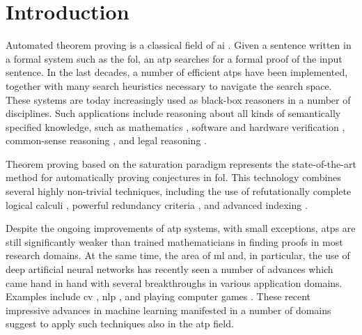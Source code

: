 \documentclass{article}
\begin{document}
\maketitle


\begin{abstract}

\end{abstract}

\section{Introduction}

Automated theorem proving is a classical field of \gls{ai} \cite{Russell2010}.
Given a sentence written in a formal system such as the \gls{fol},
an \gls{atp} searches for a formal proof of the input sentence.
In the last decades, a number of efficient \glspl{atp} have been implemented,
together with many search heuristics necessary to navigate the search space.
These systems are today increasingly used as black-box reasoners in a number of disciplines.
Such applications include reasoning about all kinds of semantically specified knowledge,
such as mathematics \cite{Kinyon2013},
software and hardware verification \cite{Ahrendt2016},
common-sense reasoning \cite{Pease2010},
and legal reasoning \cite{Passmore2017}.

Theorem proving based on the saturation paradigm \cite{DBLP:books/el/RV01/BachmairG01} represents the state-of-the-art method for automatically proving conjectures in \gls{fol}.
This technology combines several highly non-trivial techniques,
including the use of refutationally complete logical calculi \cite{DBLP:books/el/RV01/NieuwenhuisR01},
powerful redundancy criteria \cite{DBLP:books/el/RV01/BachmairG01},
and advanced indexing \cite{Voronkov1995}.

Despite the ongoing improvements of \gls{atp} systems, with small exceptions,
\glspl{atp} are still significantly weaker than trained mathematicians in finding proofs in most research domains.
At the same time, the area of \gls{ml} and, in particular, the use of deep artificial neural networks has recently seen a number of advances which came hand in hand with several breakthroughs in various application domains.
Examples include \acrlong{cv} \cite{CHAI2021100134},
\acrlong{nlp} \cite{8949185}, and
playing computer games \cite{shao2019survey}.
These recent impressive advances in machine learning manifested in a number of domains suggest to apply such techniques also in the \gls{atp} field.
\end{document}

